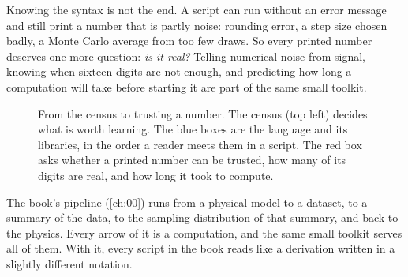 Knowing the syntax is not the end. A script can run without an error message and still print a number that is partly noise: rounding error, a step size chosen badly, a Monte Carlo average from too few draws. So every printed number deserves one more question: \emph{is it real?} Telling numerical noise from signal, knowing when sixteen digits are not enough, and predicting how long a computation will take before starting it are part of the same small toolkit.

\begin{figure}[htbp]
\centering
{}
\caption{From the census to trusting a number. The census (top left) decides what is worth learning. The blue boxes are the language and its libraries, in the order a reader meets them in a script. The red box asks whether a printed number can be trusted, how many of its digits are real, and how long it took to compute.}
\label{T0a:fig:roadmap}
\end{figure}

The book's pipeline (\cref{ch:00}) runs from a physical model to a dataset, to a summary of the data, to the sampling distribution of that summary, and back to the physics. Every arrow of it is a computation, and the same small toolkit serves all of them. With it, every script in the book reads like a derivation written in a slightly different notation.

